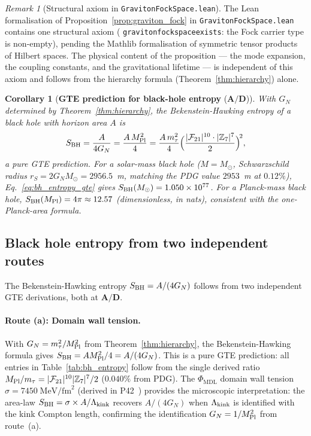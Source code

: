 \documentclass[11pt]{article}
\newtheorem{corollary}[theorem]{Corollary}
\theoremstyle{remark}
\newtheorem{remark}[theorem]{Remark}
\newcommand{\PHIMDL}{\Phi_{\mathrm{MDL}}}
\newcommand{\ZS}{\mathbb{Z}_7}
\newcommand{\lean}[1]{%
  \penalty-100
  \begingroup\def\_{\textunderscore\allowbreak}\texttt{#1}\endgroup}
\newcommand{\FTT}{\mathcal{F}_{21}}
\newcommand{\CatAD}{\textbf{A/D}}
\begin{document}
\begin{remark}[Structural axiom in \lean{GravitonFockSpace.lean}]
The Lean formalisation of Proposition~\ref{prop:graviton_fock} in
\lean{GravitonFockSpace.lean} contains one structural axiom
(\lean{graviton\_fock\_space\_exists}: the Fock carrier type is non-empty),
pending the Mathlib formalisation of symmetric tensor products of Hilbert
spaces.  The physical content of the proposition --- the mode expansion, the
coupling constants, and the gravitational lifetime --- is independent of this
axiom and follows from the hierarchy formula (Theorem~\ref{thm:hierarchy})
alone.
\end{remark}

\begin{corollary}[\textbf{GTE prediction for black-hole entropy} ($\CatAD$)]
\label{cor:bh_entropy}
With $G_N$ determined by Theorem~\ref{thm:hierarchy}, the Bekenstein-Hawking
entropy of a black hole with horizon area $A$ is
\begin{equation}
  S_{\rm BH}
  = \frac{A}{4G_N}
  = \frac{A\,M_{\rm Pl}^2}{4}
  = \frac{A\,m_\tau^2}{4}
    \Bigl(\frac{|\FTT|^{10}\cdot|\ZS|^7}{2}\Bigr)^{\!2},
  \label{eq:bh_entropy_gte}
\end{equation}
a pure GTE prediction.  For a solar-mass black hole
($M=M_\odot$, Schwarzschild radius $r_S = 2G_N M_\odot = 2956.5$~m,
matching the PDG value $2953$~m at $0.12\%$), Eq.~\eqref{eq:bh_entropy_gte}
gives $S_{\rm BH}(M_\odot) = 1.050\times10^{77}$.
For a Planck-mass black hole, $S_{\rm BH}(M_{\rm Pl}) = 4\pi\approx 12.57$
(dimensionless, in nats), consistent with the one-Planck-area formula.
\end{corollary}

\subsection{Black hole entropy from two independent routes}
\label{sec:bh_entropy}

The Bekenstein-Hawking entropy $S_{\rm BH} = A/(4G_N)$ follows from two
independent GTE derivations, both at $\CatAD$.

\paragraph{Route (a): Domain wall tension.}
With $G_N = m_\tau^2/M_{\rm Pl}^2$ from Theorem~\ref{thm:hierarchy},
the Bekenstein-Hawking formula gives $S_{\rm BH} = AM_{\rm Pl}^2/4 = A/(4G_N)$.
This is a pure GTE prediction: all entries in Table~\ref{tab:bh_entropy} follow
from the single derived ratio $M_{\rm Pl}/m_\tau = |\FTT|^{10}|\ZS|^7/2$
($0.040\%$ from PDG).  The $\PHIMDL$ domain wall tension $\sigma = 7450\;\text{MeV/fm}^2$
(derived in P42~\cite{SpivackPhiMDLField}) provides the microscopic interpretation:
the area-law $S_{\rm BH} = \sigma\times A/\Lambda_{\rm kink}$ recovers
$A/(4G_N)$ when $\Lambda_{\rm kink}$ is identified with the kink Compton length,
confirming the identification $G_N = 1/M_{\rm Pl}^2$ from route~(a).
\end{document}
